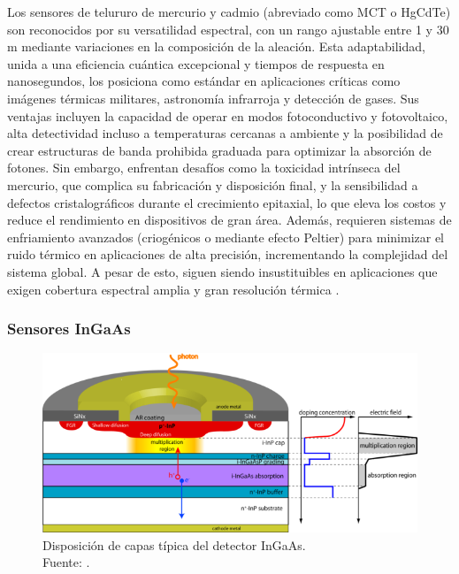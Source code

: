 Los sensores de telururo de mercurio y cadmio (abreviado como MCT o HgCdTe) son reconocidos por su versatilidad espectral, con un rango ajustable entre 1 y 30 \textmu m mediante variaciones en la composición de la aleación. Esta adaptabilidad, unida a una eficiencia cuántica excepcional y tiempos de respuesta en nanosegundos, los posiciona como estándar en aplicaciones críticas como imágenes térmicas militares, astronomía infrarroja y detección de gases. Sus ventajas incluyen la capacidad de operar en modos fotoconductivo y fotovoltaico, alta detectividad incluso a temperaturas cercanas a ambiente y la posibilidad de crear estructuras de banda prohibida graduada para optimizar la absorción de fotones. Sin embargo, enfrentan desafíos como la toxicidad intrínseca del mercurio, que complica su fabricación y disposición final, y la sensibilidad a defectos cristalográficos durante el crecimiento epitaxial, lo que eleva los costos y reduce el rendimiento en dispositivos de gran área. Además, requieren sistemas de enfriamiento avanzados (criogénicos o mediante efecto Peltier) para minimizar el ruido térmico en aplicaciones de alta precisión, incrementando la complejidad del sistema global. A pesar de esto, siguen siendo insustituibles en aplicaciones que exigen cobertura espectral amplia y gran resolución térmica \cite{capper_mercury_2010}.

\subsubsection{Sensores InGaAs}


\begin{figure}[H]
    \centering
    \includegraphics[width=0.5\linewidth]{3.Conceptos_Previos/ingaas_cross-1213932152.png}
    \caption{Disposición de capas típica del detector InGaAs. \\Fuente: \cite{everyphotoncounts2025ingaas_spad}.}
    \label{fig:enter-label}
\end{figure}

